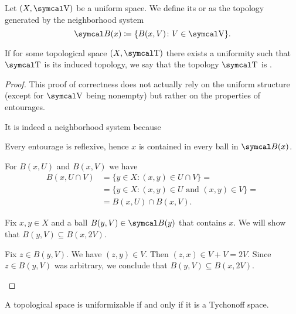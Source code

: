 \begin{definition}\label{def:uniform_topology}
  Let \( (X, \CV) \) be a uniform space. We define its  or  as the topology generated by the neighborhood system
  \begin{equation*}
    \Cal{B}(x) \coloneqq \{ B(x, V) \colon V \in \CV \}.
  \end{equation*}

  If for some topological space \( (X, \CT) \) there exists a uniformity such that \( \CT \) is its induced topology, we say that the topology \( \CT \) is .
\end{definition}
\begin{proof}
  This proof of correctness does not actually rely on the uniform structure (except for \( \CV \) being nonempty) but rather on the properties of entourages.

  It is indeed a neighborhood system because
  \begin{description}
     Every entourage is reflexive, hence \( x \) is contained in every ball in \( \Cal{B}(x) \).

     For \( B(x, U) \) and \( B(x, V) \) we have
    \begin{align*}
      B(x, U \cap V)
      &=
      \{ y \in X \colon (x, y) \in U \cap V \}
      = \\ &=
      \{ y \in X \colon (x, y) \in U \text{ and } (x, y) \in V \}
      = \\ &=
      B(x, U) \cap B(x, V).
    \end{align*}

     Fix \( x, y \in X \) and a ball \( B(y, V) \in \Cal{B}(y) \) that contains \( x \). We will show that \( B(y, V) \subseteq B(x, 2V) \).

    Fix \( z \in B(y, V) \). We have \( (z, y) \in V \). Then \( (z, x) \in V + V = 2V \). Since \( z \in B(y, V) \) was arbitrary, we conclude that \( B(y, V) \subseteq B(x, 2V) \).
  \end{description}
\end{proof}

\begin{theorem}\label{thm:tychonoff_spaces_are_uniformizable}\cite[theorem 8.1.20]{Engelking1989}
  A topological space is uniformizable if and only if it is a Tychonoff space.
\end{theorem}

